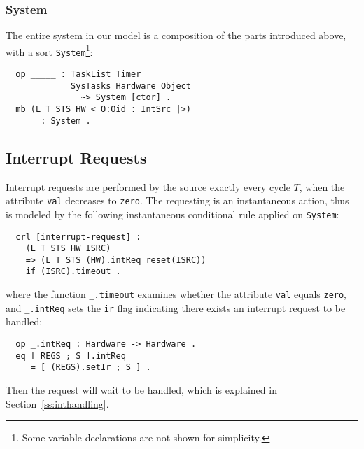 \documentclass[10pt,journal,compsoc]{IEEEtran}
\begin{document}
\subsubsection{System}
The entire system in our model is a composition of the parts
introduced above, with a sort \verb|System|\footnote{Some variable
  declarations are not shown for simplicity.}:
\begin{verbatim}
  op _____ : TaskList Timer 
             SysTasks Hardware Object 
               ~> System [ctor] .
  mb (L T STS HW < O:Oid : IntSrc |>) 
       : System .
\end{verbatim}

\subsection{Interrupt Requests}
\label{ss:ir}
Interrupt requests are performed by the source exactly every cycle
$T$, when the attribute \verb|val| decreases to \verb|zero|. The
requesting is an instantaneous action, thus is modeled by the
following instantaneous conditional rule applied on \verb|System|:
\begin{verbatim}
  crl [interrupt-request] :
    (L T STS HW ISRC) 
    => (L T STS (HW).intReq reset(ISRC))
    if (ISRC).timeout .
\end{verbatim}
where the function \verb|_.timeout| examines whether the attribute
\verb|val| equals \verb|zero|, and \verb|_.intReq| sets the \verb|ir|
flag indicating there exists an interrupt request to be handled:
\begin{verbatim}
  op _.intReq : Hardware -> Hardware .
  eq [ REGS ; S ].intReq 
     = [ (REGS).setIr ; S ] .
\end{verbatim}
Then the request will wait to be handled, which is explained in
Section~\ref{ss:inthandling}.
\end{document}
